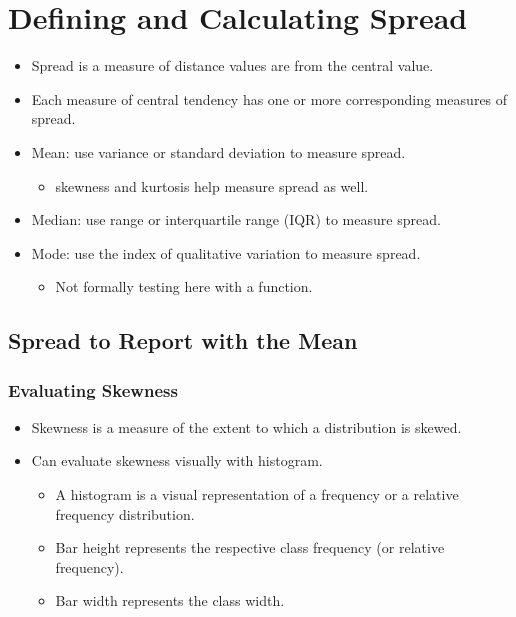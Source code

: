 \documentclass[
  letterpaper,
  DIV=11,
  numbers=noendperiod]{scrreprt}
\providecommand{\tightlist}{%
  \setlength{\itemsep}{0pt}\setlength{\parskip}{0pt}}\usepackage{longtable,booktabs,array}
\begin{document}
\section{Defining and Calculating
Spread}\label{defining-and-calculating-spread}

\begin{itemize}
\tightlist
\item
  Spread is a measure of distance values are from the central value.
\item
  Each measure of central tendency has one or more corresponding
  measures of spread.
\item
  Mean: use variance or standard deviation to measure spread.

  \begin{itemize}
  \tightlist
  \item
    skewness and kurtosis help measure spread as well.
  \end{itemize}
\item
  Median: use range or interquartile range (IQR) to measure spread.
\item
  Mode: use the index of qualitative variation to measure spread.

  \begin{itemize}
  \tightlist
  \item
    Not formally testing here with a function.
  \end{itemize}
\end{itemize}

\subsection{Spread to Report with the
Mean}\label{spread-to-report-with-the-mean}

\subsubsection{Evaluating Skewness}\label{evaluating-skewness}

\begin{itemize}
\tightlist
\item
  Skewness is a measure of the extent to which a distribution is skewed.
\item
  Can evaluate skewness visually with histogram.

  \begin{itemize}
  \tightlist
  \item
    A histogram is a visual representation of a frequency or a relative
    frequency distribution.
  \item
    Bar height represents the respective class frequency (or relative
    frequency).
  \item
    Bar width represents the class width.
  \end{itemize}
\end{itemize}
\end{document}
